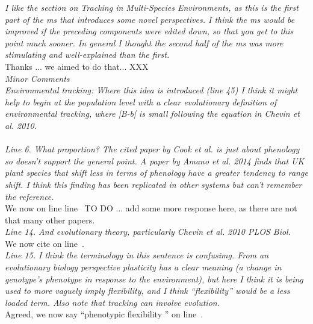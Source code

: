 \documentclass[11pt]{article}
\newcommand{\lr}[1]{line~\lineref{#1}}
\begin{document}
\emph{I like the section on Tracking in Multi-Species Environments, as this is the first part of
the ms that introduces some novel perspectives. I think the ms would be improved if the
preceding components were edited down, so that you get to this point much sooner. In general
I thought the second half of the ms was more stimulating and well-explained than the first.}\\

Thanks ... we aimed to do that... XXX\\

\emph{Minor Comments\\
Environmental tracking: Where this idea is introduced (line 45) I think it might help to
begin at the population level with a clear evolutionary definition of environmental tracking,
where |B-b| is small following the equation in Chevin et al. 2010.}\\

\\

\emph{Line 6. What proportion? The cited paper by Cook et al. is just about phenology so doesn't
support the general point. A paper by Amano et al. 2014 finds that UK plant species that
shift less in terms of phenology have a greater tendency to range shift. I think this finding
has been replicated in other systems but can’t remember the reference.}\\

We now \citet{amano2014} on line \lr{r4misc.} TO DO ... add some more response here, as there are not that many other papers. \\

\emph{Line 14. And evolutionary theory, particularly Chevin et al. 2010 PLOS Biol.}\\

We now cite \citet{chevin2010} on \lr{r4misc1}.\\

\emph{Line 15. I think the terminology in this sentence is confusimg. From an evolutionary biology
perspective plasticity has a clear meaning (a change in genotype’s phenotype in response to
the environment), but here I think it is being used to more vaguely imply flexibility, and I
think “flexibility” would be a less loaded term. Also note that tracking can involve
evolution.}\\

Agreed, we now say ``phenotypic flexibility \citep{Piersma:2003wj}'' on \lr{r4misc2}.\\
\end{document}
